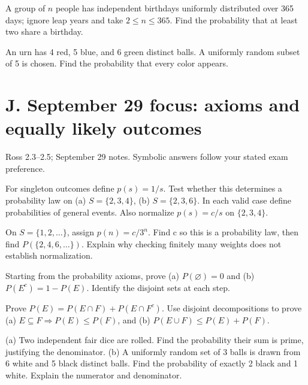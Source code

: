 \documentclass[11pt]{article}
\newcommand{\qid}[1]{\par\needspace{5\baselineskip}\noindent{\color{accent}\bfseries #1}\quad}
\newcommand{\source}[1]{{\small\color{muted}#1}\par}
\begin{document}
\qid{I4} A group of \(n\) people has independent birthdays uniformly distributed over 365 days; ignore leap years and take \(2\le n\le365\). Find the probability that at least two share a birthday.
\par\vspace{0.40in}

\qid{I5} An urn has 4 red, 5 blue, and 6 green distinct balls. A uniformly random subset of 5 is chosen. Find the probability that every color appears.
\par\vspace{0.40in}


\clearpage
\section*{J. September 29 focus: axioms and equally likely outcomes}
\source{Ross 2.3--2.5; September 29 notes. Symbolic answers follow your stated exam preference.}
\qid{J1} For singleton outcomes define \(p(s)=1/s\). Test whether this determines a probability law on (a) \(S=\{2,3,4\}\), (b) \(S=\{2,3,6\}\). In each valid case define probabilities of general events. Also normalize \(p(s)=c/s\) on \(\{2,3,4\}\).
\par\vspace{0.40in}

\qid{J2} On \(S=\{1,2,\ldots\}\), assign \(p(n)=c/3^n\). Find c so this is a probability law, then find \(P(\{2,4,6,\ldots\})\). Explain why checking finitely many weights does not establish normalization.
\par\vspace{0.40in}

\qid{J3} Starting from the probability axioms, prove (a) \(P(\varnothing)=0\) and (b) \(P(E^c)=1-P(E)\). Identify the disjoint sets at each step.
\par\vspace{0.40in}

\qid{J4} Prove \(P(E)=P(E\cap F)+P(E\cap F^c)\). Use disjoint decompositions to prove (a) \(E\subseteq F\Rightarrow P(E)\le P(F)\), and (b) \(P(E\cup F)\le P(E)+P(F)\).
\par\vspace{0.40in}

\qid{J5} (a) Two independent fair dice are rolled. Find the probability their sum is prime, justifying the denominator. (b) A uniformly random set of 3 balls is drawn from 6 white and 5 black distinct balls. Find the probability of exactly 2 black and 1 white. Explain the numerator and denominator.
\par\vspace{0.40in}
\end{document}
